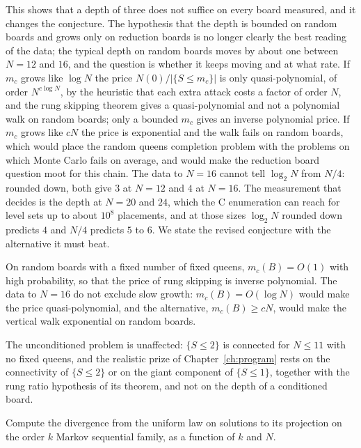 This shows that a depth of three does not suffice on every board measured, and it changes the conjecture. The hypothesis that the depth is bounded on random boards and grows only on reduction boards is no longer clearly the best reading of the data; the typical depth on random boards moves by about one between $N = 12$ and $16$, and the question is whether it keeps moving and at what rate. If $m_c$ grows like $\log N$ the price $N(0) / |\{ S \le m_c \}|$ is only quasi-polynomial, of order $N^{c \log N}$, by the heuristic that each extra attack costs a factor of order $N$, and the rung skipping theorem gives a quasi-polynomial and not a polynomial walk on random boards; only a bounded $m_c$ gives an inverse polynomial price. If $m_c$ grows like $cN$ the price is exponential and the walk fails on random boards, which would place the random queens completion problem with the problems on which Monte Carlo fails on average, and would make the reduction board question moot for this chain. The data to $N = 16$ cannot tell $\log_2 N$ from $N / 4$: rounded down, both give $3$ at $N = 12$ and $4$ at $N = 16$. The measurement that decides is the depth at $N = 20$ and $24$, which the C enumeration can reach for level sets up to about $10^8$ placements, and at those sizes $\log_2 N$ rounded down predicts $4$ and $N / 4$ predicts $5$ to $6$. We state the revised conjecture with the alternative it must beat.

\begin{conjecture}
\label{conj:depthgrowth}
On random boards with a fixed number of fixed queens, $m_c(B) = O(1)$ with high probability, so that the price of rung skipping is inverse polynomial. The data to $N = 16$ do not exclude slow growth: $m_c(B) = O(\log N)$ would make the price quasi-polynomial, and the alternative, $m_c(B) \ge cN$, would make the vertical walk exponential on random boards.
\end{conjecture}

The unconditioned problem is unaffected: $\{ S \le 2 \}$ is connected for $N \le 11$ with no fixed queens, and the realistic prize of Chapter~\ref{ch:program} rests on the connectivity of $\{ S \le 2 \}$ or on the giant component of $\{ S \le 1 \}$, together with the rung ratio hypothesis of its theorem, and not on the depth of a conditioned board.

\begin{problem}
Compute the divergence from the uniform law on solutions to its projection on the order $k$ Markov sequential family, as a function of $k$ and $N$.
\end{problem}

